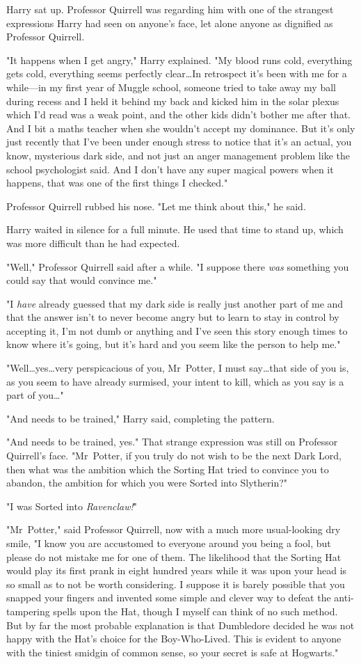 Harry sat up. Professor Quirrell was regarding him with one of the strangest
expressions Harry had seen on anyone's face, let alone anyone as dignified as
Professor Quirrell.

"It happens when I get angry," Harry explained. "My blood runs cold, everything
gets cold, everything seems perfectly clear…In retrospect it's been
with me for a while—in my first year of Muggle school, someone tried to take
away my ball during recess and I held it behind my back and kicked him in the
solar plexus which I'd read was a weak point, and the other kids didn't bother
me after that. And I bit a maths teacher when she wouldn't accept my dominance.
But it's only just recently that I've been under enough stress to notice that
it's an actual, you know, mysterious dark side, and not just an anger
management problem like the school psychologist said. And I don't have any
super magical powers when it happens, that was one of the first things I
checked."

Professor Quirrell rubbed his nose. "Let me think about this," he said.

Harry waited in silence for a full minute. He used that time to stand up, which
was more difficult than he had expected.

"Well," Professor Quirrell said after a while. "I suppose there \emph{was}
something you could say that would convince me."

"I \emph{have} already guessed that my dark side is really just another part of
me and that the answer isn't to never become angry but to learn to stay in
control by accepting it, I'm not dumb or anything and I've seen this story
enough times to know where it's going, but it's hard and you seem like the
person to help me."

"Well…yes…very perspicacious of you, Mr~Potter, I must
say…that side of you is, as you seem to have already surmised, your
intent to kill, which as you say is a part of you…"

"And needs to be trained," Harry said, completing the pattern.

"And needs to be trained, yes." That strange expression was still on Professor
Quirrell's face. "Mr~Potter, if you truly do not wish to be the next Dark
Lord, then what was the ambition which the Sorting Hat tried to convince you to
abandon, the ambition for which you were Sorted into Slytherin?"

"I was Sorted into \emph{Ravenclaw!}"

"Mr~Potter," said Professor Quirrell, now with a much more usual-looking dry
smile, "I know you are accustomed to everyone around you being a fool, but
please do not mistake me for one of them. The likelihood that the Sorting Hat
would play its first prank in eight hundred years while it was upon your head
is so small as to not be worth considering. I suppose it is barely possible
that you snapped your fingers and invented some simple and clever way to defeat
the anti-tampering spells upon the Hat, though I myself can think of no such
method. But by far the most probable explanation is that Dumbledore decided he
was not happy with the Hat's choice for the Boy-Who-Lived. This is evident to
anyone with the tiniest smidgin of common sense, so your secret is safe at
Hogwarts."

